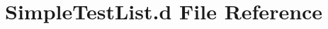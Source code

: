 \hypertarget{SimpleTestList_8d}{\section{Simple\-Test\-List.\-d File Reference}
\label{SimpleTestList_8d}
}
